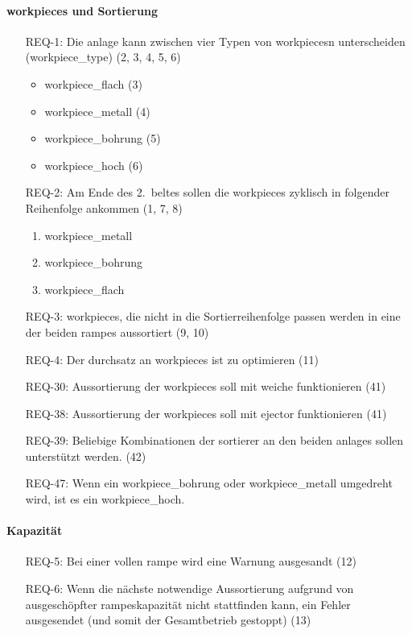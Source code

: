 \paragraph{\glspl{workpiece} und Sortierung}
\begin{itemize}
    \item[REQ-1:] Die \gls{anlage} kann zwischen vier Typen von \glspl{workpiece}n unterscheiden (\gls{workpiece_type}) (2, 3, 4, 5, 6)
    \begin{itemize}
        \item \gls{workpiece_flach} (3)
        \item \gls{workpiece_metall} (4)
        \item \gls{workpiece_bohrung} (5)
        \item \gls{workpiece_hoch} (6)
    \end{itemize}
    \item[REQ-2:] Am Ende des 2.\ \gls{belt}es sollen die \glspl{workpiece} zyklisch in folgender Reihenfolge ankommen (1, 7, 8)
    \begin{enumerate}
        \item \gls{workpiece_metall}
        \item \gls{workpiece_bohrung}
        \item \gls{workpiece_flach}
    \end{enumerate}
    \item[REQ-3:] \glspl{workpiece}, die nicht in die Sortierreihenfolge passen werden in eine der beiden \glspl{rampe} aussortiert (9, 10)
    \item[REQ-4:] Der \gls{durchsatz} an \glspl{workpiece} ist zu optimieren (11)
    \item[REQ-30:] Aussortierung der \glspl{workpiece} soll mit \gls{weiche} funktionieren (41)
    \item[REQ-38:] Aussortierung der \glspl{workpiece} soll mit \gls{ejector} funktionieren (41)
    \item[REQ-39:] Beliebige Kombinationen der \gls{sortierer} an den beiden \glspl{anlage} sollen unterstützt werden. (42)
    \item[REQ-47:] Wenn ein \gls{workpiece_bohrung} oder \gls{workpiece_metall} umgedreht wird, ist es ein \gls{workpiece_hoch}.
\end{itemize}

\paragraph{Kapazität}
\begin{itemize}
    \item[REQ-5:] Bei einer vollen \gls{rampe} wird eine Warnung ausgesandt (12)
    \item[REQ-6:] Wenn die nächste notwendige Aussortierung aufgrund von ausgeschöpfter \glspl{rampe}kapazität
    nicht stattfinden kann, ein Fehler ausgesendet (und somit der Gesamtbetrieb gestoppt) (13)
\end{itemize}

